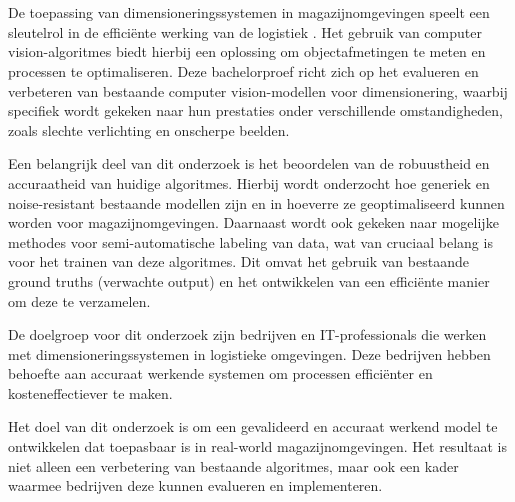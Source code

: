 
\chapter{}%
\label{ch:inleiding}


De toepassing van dimensioneringssystemen in magazijnomgevingen speelt een sleutelrol in de efficiënte werking van de logistiek \autocite{Cornell2015} \autocite{FreightSnap2019}. Het gebruik van computer vision-algoritmes biedt hierbij een oplossing om objectafmetingen te meten en processen te optimaliseren. Deze bachelorproef richt zich op het evalueren en verbeteren van bestaande computer vision-modellen voor dimensionering, waarbij specifiek wordt gekeken naar hun prestaties onder verschillende omstandigheden, zoals slechte verlichting en onscherpe beelden.

Een belangrijk deel van dit onderzoek is het beoordelen van de robuustheid en accuraatheid van huidige algoritmes. Hierbij wordt onderzocht hoe generiek en noise-resistant bestaande modellen zijn en in hoeverre ze geoptimaliseerd kunnen worden voor magazijnomgevingen. Daarnaast wordt ook gekeken naar mogelijke methodes voor semi-automatische labeling van data, wat van cruciaal belang is voor het trainen van deze algoritmes. Dit omvat het gebruik van bestaande ground truths (verwachte output) en het ontwikkelen van een efficiënte manier om deze te verzamelen.

De doelgroep voor dit onderzoek zijn bedrijven en IT-professionals die werken met dimensioneringssystemen in logistieke omgevingen. Deze bedrijven hebben behoefte aan accuraat werkende systemen om processen efficiënter en kosteneffectiever te maken.



Het doel van dit onderzoek is om een gevalideerd en accuraat werkend model te ontwikkelen dat toepasbaar is in real-world magazijnomgevingen. Het resultaat is niet alleen een verbetering van bestaande algoritmes, maar ook een kader waarmee bedrijven deze kunnen evalueren en implementeren.



\section{}%
\label{sec:probleemstelling}

